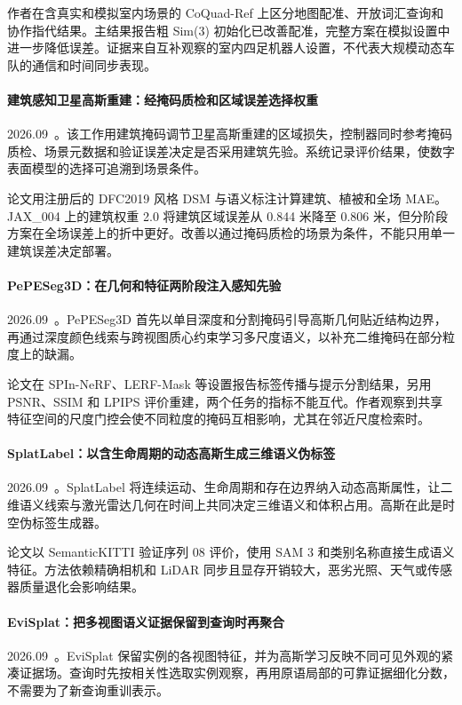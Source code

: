 作者在含真实和模拟室内场景的 CoQuad-Ref 上区分地图配准、开放词汇查询和协作指代结果。主结果报告粗 Sim(3) 初始化已改善配准，完整方案在模拟设置中进一步降低误差。证据来自互补观察的室内四足机器人设置，不代表大规模动态车队的通信和时间同步表现。

\paragraph{建筑感知卫星高斯重建：经掩码质检和区域误差选择权重}
2026.09~\cite{2609_25578}。该工作用建筑掩码调节卫星高斯重建的区域损失，控制器同时参考掩码质检、场景元数据和验证误差决定是否采用建筑先验。系统记录评价结果，使数字表面模型的选择可追溯到场景条件。

论文用注册后的 DFC2019 风格 DSM 与语义标注计算建筑、植被和全场 MAE。JAX\_004 上的建筑权重 2.0 将建筑区域误差从 0.844 米降至 0.806 米，但分阶段方案在全场误差上的折中更好。改善以通过掩码质检的场景为条件，不能只用单一建筑误差决定部署。

\paragraph{PePESeg3D：在几何和特征两阶段注入感知先验}
2026.09~\cite{2609_28645}。PePESeg3D 首先以单目深度和分割掩码引导高斯几何贴近结构边界，再通过深度颜色线索与跨视图质心约束学习多尺度语义，以补充二维掩码在部分粒度上的缺漏。

论文在 SPIn-NeRF、LERF-Mask 等设置报告标签传播与提示分割结果，另用 PSNR、SSIM 和 LPIPS 评价重建，两个任务的指标不能互代。作者观察到共享特征空间的尺度门控会使不同粒度的掩码互相影响，尤其在邻近尺度检索时。

\paragraph{SplatLabel：以含生命周期的动态高斯生成三维语义伪标签}
2026.09~\cite{2609_29836}。SplatLabel 将连续运动、生命周期和存在边界纳入动态高斯属性，让二维语义线索与激光雷达几何在时间上共同决定三维语义和体积占用。高斯在此是时空伪标签生成器。

论文以 SemanticKITTI 验证序列 08 评价，使用 SAM 3 和类别名称直接生成语义特征。方法依赖精确相机和 LiDAR 同步且显存开销较大，恶劣光照、天气或传感器质量退化会影响结果。

\paragraph{EviSplat：把多视图语义证据保留到查询时再聚合}
2026.09~\cite{2609_34853}。EviSplat 保留实例的各视图特征，并为高斯学习反映不同可见外观的紧凑证据场。查询时先按相关性选取实例观察，再用原语局部的可靠证据细化分数，不需要为了新查询重训表示。

